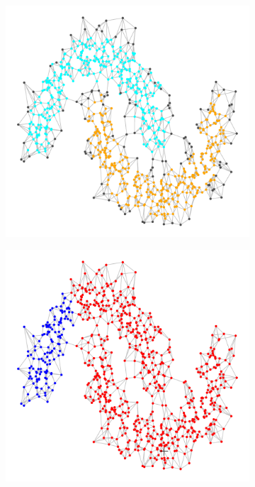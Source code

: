 \documentclass{article}
\newcommand{\1}{\mathbf{1}}
\theoremstyle{aldenthm}
\theoremstyle{aldenrmrk}
\begin{document}
\begin{figure}
\begin{adjustbox}{minipage=\linewidth,scale=0.8}
	\begin{subfigure}{.24\linewidth}
		\includegraphics[width=\linewidth]{example2plots/row3_true_density_cluster}
		\caption{}
	\end{subfigure}
	\begin{subfigure}{.24\linewidth}
		\includegraphics[width=\linewidth]{example2plots/row3_ppr_cluster}

\end{subfigure}
\end{adjustbox}
\end{figure}
\end{document}
